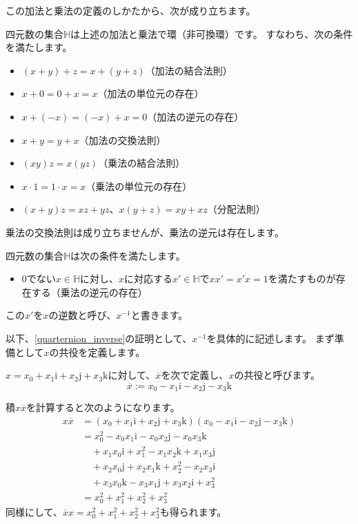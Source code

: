 \documentclass{jlreq}
\numberwithin{equation}{section}
\newcommand{\ii}{\mathrm{i}}
\newcommand{\jj}{\mathrm{j}}
\newcommand{\kk}{\mathrm{k}}
\begin{document}
この加法と乗法の定義のしかたから、次が成り立ちます。

\begin{theorem}
    四元数の集合\(\mathbb{H}\)は上述の加法と乗法で環（非可換環）です。
    すなわち、次の条件を満たします。
    \begin{itemize}
        \item \((x+y)+z=x+(y+z)\)（加法の結合法則）
        \item \(x+0=0+x=x\)（加法の単位元の存在）
        \item \(x+(-x)=(-x)+x=0\)（加法の逆元の存在）
        \item \(x+y=y+x\)（加法の交換法則）
        \item \((xy)z=x(yz)\)（乗法の結合法則）
        \item \(x\cdot 1=1\cdot x=x\)（乗法の単位元の存在）
        \item \((x+y)z=xz+yz\)、\(x(y+z)=xy+xz\)（分配法則）
    \end{itemize}
\end{theorem}

乗法の交換法則は成り立ちませんが、乗法の逆元は存在します。

\begin{theorem}\label{quarternion_inverse}
    四元数の集合\(\mathbb{H}\)は次の条件を満たします。
    \begin{itemize}
        \item \(0\)でない\(x\in\mathbb{H}\)に対し、\(x\)に対応する\(x'\in\mathbb{H}\)で\(xx'=x'x=1\)を満たすものが存在する（乗法の逆元の存在）
    \end{itemize}
    この\(x'\)を\(x\)の逆数と呼び、\(x^{-1}\)と書きます。
\end{theorem}

以下、\autoref{quarternion_inverse}の証明として、\(x^{-1}\)を具体的に記述します。
まず準備として\(x\)の共役を定義します。

\begin{definition}
    \(x=x_0+x_1\ii+x_2\jj+x_3\kk\)に対して、\(\overline{x}\)を次で定義し、\(x\)の共役と呼びます。
    \[
        \overline{x}:=x_0-x_1\ii-x_2\jj-x_3\kk
    \]
\end{definition}

積\(x\overline{x}\)を計算すると次のようになります。
\begin{align}
    x\overline{x} & =(x_0+x_1\ii+x_2\jj+x_3\kk)(x_0-x_1\ii-x_2\jj-x_3\kk) \\
                  & =x_0^2-x_0x_1\ii-x_0x_2\jj-x_0x_3\kk                  \\
                  & \quad +x_1x_0\ii+x_1^2-x_1x_2\kk+x_1x_3\jj            \\
                  & \quad +x_2x_0\jj+x_2x_1\kk+x_2^2-x_2x_3\ii            \\
                  & \quad +x_3x_0\kk-x_3x_1\jj+x_3x_2\ii+x_3^2            \\
                  & =x_0^2+x_1^2+x_2^2+x_3^2
\end{align}
同様にして、\(\overline{x}x=x_0^2+x_1^2+x_2^2+x_3^2\)も得られます。
\end{document}
